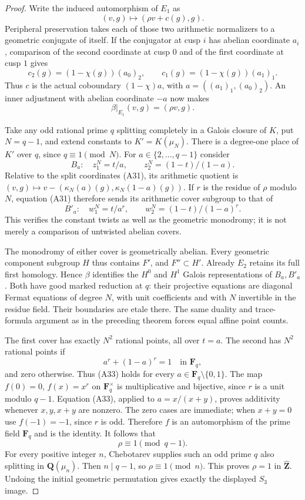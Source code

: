 \documentclass[11pt,oneside]{article}
\begin{document}
\begin{proof}
Write the induced automorphism of $E_1$ as
\[
               (v,g)\longmapsto(\rho v+c(g),g).
\]
Peripheral preservation takes each of those two
arithmetic normalizers to a geometric conjugate of
itself. If the conjugator at cusp $i$ has abelian
coordinate $a_i$, comparison of the second coordinate
at cusp $0$ and of the first coordinate at cusp $1$
gives
\[
 c_2(g)=(1-\chi(g))(a_0)_2,
       \qquad c_1(g)=(1-\chi(g))(a_1)_1.
\]
Thus $c$ is the actual coboundary
$(1-\chi)a$, with $a=((a_1)_1,(a_0)_2)$.
An inner adjustment with abelian coordinate $-a$
now makes
\[
                   \beta|_{E_1}(v,g)=(\rho v,g).             \tag{A31}
\]

Take any odd rational prime $q$ splitting completely
in a Galois closure of $K$, put $N=q-1$, and extend
constants to $K'=K(\mu_N)$. There is a degree-one
place of $K'$ over $q$, since $q\equiv1\pmod N$.
For $a\in\{2,\ldots,q-1\}$ consider
\[
 B_a:\quad z_1^N=t/a,\qquad z_2^N=(1-t)/(1-a).
\]
Relative to the split coordinates (A31), its arithmetic
quotient is $(v,g)\mapsto v-(\kappa_N(a)(g),
\kappa_N(1-a)(g))$. If $r$ is the residue of $\rho$
modulo $N$, equation (A31) therefore sends its
arithmetic cover subgroup to that of
\[
 B'_a:\quad w_1^N=t/a^r,\qquad
                  w_2^N=(1-t)/(1-a)^r.                      \tag{A32}
\]
This verifies the constant twists as well as the
geometric monodromy; it is not merely a comparison
of untwisted abelian covers.

The monodromy of either cover is geometrically abelian.
Every geometric component subgroup $H$ thus contains
$F'$, and $F''\subset H'$. Already $E_2$ retains
its full first homology. Hence $\beta$ identifies the
$H^0$ and $H^1$ Galois representations of $B_a,B'_a$.
Both have good marked reduction at $q$: their
projective equations are diagonal Fermat equations
of degree $N$, with unit coefficients and with
$N$ invertible in the residue field. Their boundaries
are etale there. The same duality and trace-formula
argument as in the preceding theorem forces equal
affine point counts.

The first cover has exactly $N^2$ rational points,
all over $t=a$. The second has $N^2$ rational points
if
\[
                     a^r+(1-a)^r=1\quad\text{in }\mathbf F_q,
                                                               \tag{A33}
\]
and zero otherwise. Thus (A33) holds for every
$a\in\mathbf F_q\setminus\{0,1\}$.
The map $f(0)=0$, $f(x)=x^r$ on $\mathbf F_q^\times$
is multiplicative and bijective, since $r$ is a unit
modulo $q-1$. Equation (A33), applied to
$a=x/(x+y)$, proves additivity whenever
$x,y,x+y$ are nonzero. The zero cases are immediate;
when $x+y=0$ use $f(-1)=-1$, since $r$ is odd.
Therefore $f$ is an automorphism of the prime field
$\mathbf F_q$ and is the identity. It follows that
\[
                         \rho\equiv1\pmod{q-1}.
\]
For every positive integer $n$, Chebotarev supplies
such an odd prime $q$ also splitting in $\mathbf Q(\mu_n)$.
Then $n\mid q-1$, so $\rho\equiv1\pmod n$.
This proves $\rho=1$ in $\widehat{\mathbf Z}$.
Undoing the initial geometric permutation gives exactly
the displayed $S_3$ image.
\end{proof}
\end{document}
